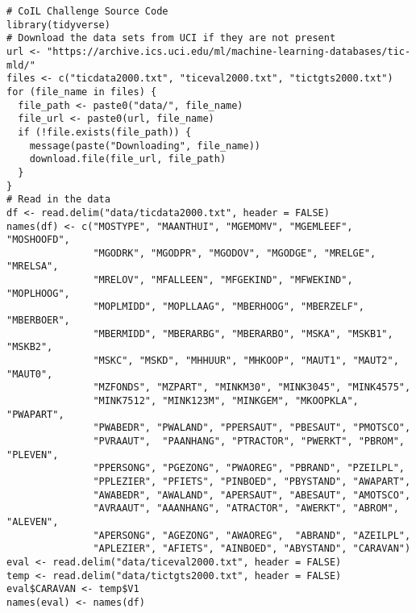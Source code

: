 \documentclass[man]{apa6}
\begin{document}
\begin{verbatim}
# CoIL Challenge Source Code 
library(tidyverse) 
# Download the data sets from UCI if they are not present 
url <- "https://archive.ics.uci.edu/ml/machine-learning-databases/tic-mld/" 
files <- c("ticdata2000.txt", "ticeval2000.txt", "tictgts2000.txt") 
for (file_name in files) { 
  file_path <- paste0("data/", file_name) 
  file_url <- paste0(url, file_name) 
  if (!file.exists(file_path)) { 
    message(paste("Downloading", file_name)) 
    download.file(file_url, file_path) 
  } 
} 
# Read in the data 
df <- read.delim("data/ticdata2000.txt", header = FALSE) 
names(df) <- c("MOSTYPE", "MAANTHUI", "MGEMOMV", "MGEMLEEF", "MOSHOOFD", 
               "MGODRK", "MGODPR", "MGODOV", "MGODGE", "MRELGE", "MRELSA", 
               "MRELOV", "MFALLEEN", "MFGEKIND", "MFWEKIND", "MOPLHOOG", 
               "MOPLMIDD", "MOPLLAAG", "MBERHOOG", "MBERZELF", "MBERBOER", 
               "MBERMIDD", "MBERARBG", "MBERARBO", "MSKA", "MSKB1", "MSKB2", 
               "MSKC", "MSKD", "MHHUUR", "MHKOOP", "MAUT1", "MAUT2", "MAUT0", 
               "MZFONDS", "MZPART", "MINKM30", "MINK3045", "MINK4575", 
               "MINK7512", "MINK123M", "MINKGEM", "MKOOPKLA", "PWAPART", 
               "PWABEDR", "PWALAND", "PPERSAUT", "PBESAUT", "PMOTSCO", 
               "PVRAAUT",  "PAANHANG", "PTRACTOR", "PWERKT", "PBROM", "PLEVEN", 
               "PPERSONG", "PGEZONG", "PWAOREG", "PBRAND", "PZEILPL", 
               "PPLEZIER", "PFIETS", "PINBOED", "PBYSTAND", "AWAPART", 
               "AWABEDR", "AWALAND", "APERSAUT", "ABESAUT", "AMOTSCO", 
               "AVRAAUT", "AAANHANG", "ATRACTOR", "AWERKT", "ABROM", "ALEVEN", 
               "APERSONG", "AGEZONG", "AWAOREG",  "ABRAND", "AZEILPL", 
               "APLEZIER", "AFIETS", "AINBOED", "ABYSTAND", "CARAVAN") 
eval <- read.delim("data/ticeval2000.txt", header = FALSE) 
temp <- read.delim("data/tictgts2000.txt", header = FALSE) 
eval$CARAVAN <- temp$V1 
names(eval) <- names(df) 
\end{verbatim}
\end{document}
